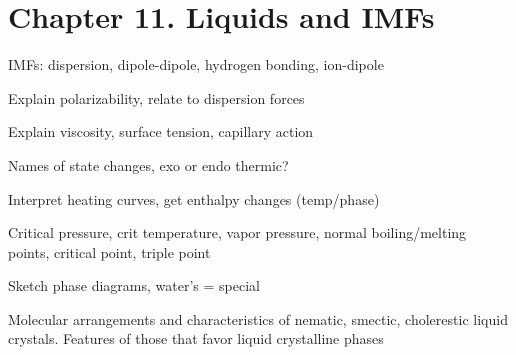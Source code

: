 \section{Chapter 11. Liquids and IMFs}

\secttoc

{\footnotesize
\begin{multicols}{3}
\begin{compactenum}
    \item IMFs: dispersion, dipole-dipole, hydrogen bonding, ion-dipole
    \item Explain polarizability, relate to dispersion forces
    \item Explain viscosity, surface tension, capillary action
    \item Names of state changes, exo or endo thermic?
    \item Interpret heating curves, get enthalpy changes (temp/phase)
    \item Critical pressure, crit temperature, vapor pressure,
        normal boiling/melting points, critical point, triple point
    \item Sketch phase diagrams, water's = special
    \item Molecular arrangements and characteristics of nematic, smectic,
        cholerestic liquid crystals. Features of those that favor liquid
        crystalline phases
\end{compactenum}
\end{multicols}
}


